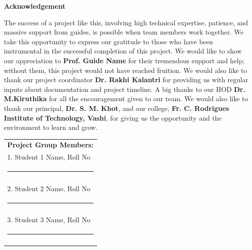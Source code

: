 
\begin{centering}
    \large
{\LARGE\bf Acknowledgement}\\
\end{centering}
    
\justify
The success of a project like this, involving high technical expertise, patience, and massive support from guides, is possible when team members work together. We take this opportunity to express our gratitude to those who have been instrumental in the successful completion of this project. We would like to show our appreciation to \textbf{Prof. Guide Name} for their tremendous support and help; without them, this project would not have reached fruition. We would also like to thank our project coordinator \textbf{Dr. Rakhi Kalantri} for providing us with regular inputs about documentation and project timeline. A big thanks to our HOD \textbf{Dr. M.Kiruthika } for all the encouragement given to our team. We would also like to thank our principal, \textbf{Dr. S. M. Khot}, and our college, \textbf{Fr. C. Rodrigues Institute of Technology, Vashi}, for giving us the opportunity and the environment to learn and grow.

\vspace{3cm}
\hfill%
\begin{tabular}[t]{l@{}}
\vspace{1cm}

{\textbf{Project Group Members:}} \\ 
\vspace{1cm}

1. Student 1 Name, Roll No \\
\noindent\rule{5cm}{0.10pt} \\
\\
\vspace{1cm}

2. Student 2 Name, Roll No \\
\noindent\rule{5cm}{0.10pt} \\
\\
\vspace{1cm}

3. Student 3 Name, Roll No \\
 \noindent\rule{5cm}{0.10pt}
\\
\vspace{1cm}
\end{tabular}

